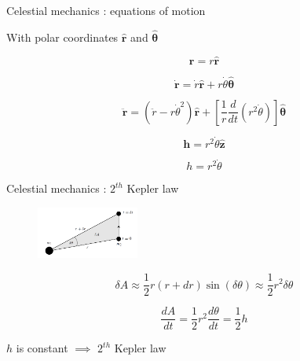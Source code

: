 \documentclass{beamer}
\begin{document}
\begin{frame}{Celestial mechanics \cite{murray1999solar}: equations of motion}
\begin{center}
With polar coordinates  $\hat{\textbf{r}}$ and $\hat{\boldsymbol{\theta}}$
\end{center}
\begin{equation}
\textbf{r}=r\hat{\textbf{r}}
\end{equation}

\begin{equation}
\dot{\textbf{r}}=\dot{r}\hat{\textbf{r}}+r\dot{\theta}\hat{\boldsymbol{\theta}}
\label{eq_dyn_nop}
\end{equation}

\begin{equation}
\ddot{\textbf{r}}=\left(\ddot{r}-r\dot{\theta}^{2}\right)\hat{\textbf{r}}+\left[\dfrac{1}{r}\frac{d}{dt}\left(r^{2}\dot{\theta}\right)\right]\hat{\boldsymbol{\theta}}
\end{equation}

\begin{equation}
\textbf{h}=r^{2}\dot{\theta}\hat{\textbf{z}}
\end{equation}


\begin{equation}
h=r^{2}\dot{\theta}
\end{equation}

\end{frame}


\begin{frame}{Celestial mechanics \cite{murray1999solar}: $2^{th}$ Kepler law}

\begin{figure}[h]
\begin{center}
\includegraphics[width=0.3\textwidth]{Pic/Area_dynamics.png}
\caption{\cite{murray1999solar}}
\label{Area_dynamics}
\end{center}
\end{figure}

\begin{equation}
\delta A \approx \dfrac{1}{2} r(r+dr)\sin(\delta\theta) \approx  \dfrac{1}{2} r^{2}\delta\theta
\end{equation}

\begin{equation}
\dfrac{dA}{dt}=\dfrac{1}{2}r^{2}\dfrac{d\theta}{dt}=\dfrac{1}{2}h
\end{equation}

\begin{center}
$h$ is constant $\implies$ $2^{th}$ Kepler law
\end{center}


\end{frame}
\end{document}
